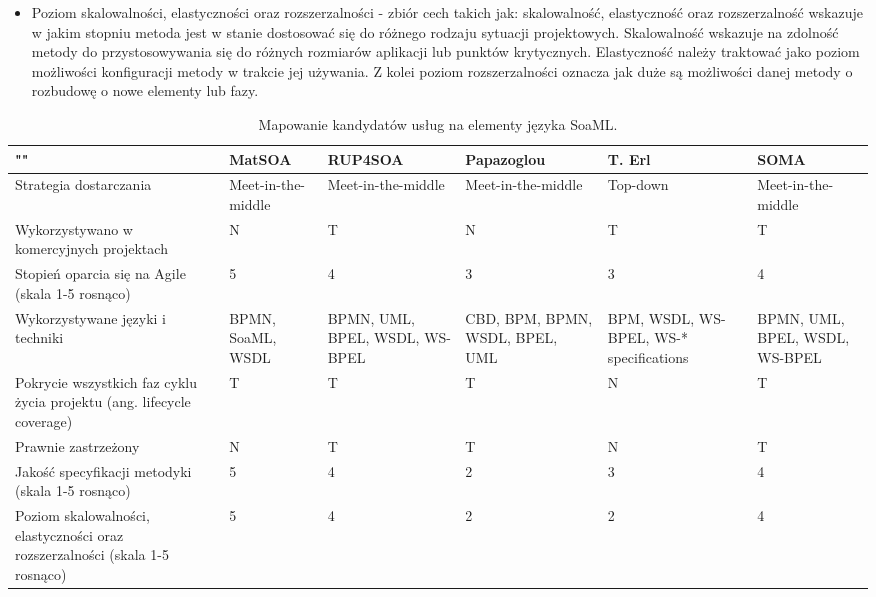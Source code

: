 \begin{itemize}
\item{Poziom skalowalności, elastyczności oraz rozszerzalności - zbiór cech takich jak: skalowalność, elastyczność oraz rozszerzalność wskazuje w jakim stopniu metoda jest w stanie dostosować się do różnego rodzaju sytuacji projektowych. Skalowalność wskazuje na zdolność metody do przystosowywania się do różnych rozmiarów aplikacji lub punktów krytycznych. Elastyczność należy traktować jako poziom możliwości konfiguracji metody w trakcie jej używania. Z kolei poziom rozszerzalności oznacza jak duże są możliwości danej metody o rozbudowę o nowe elementy lub fazy. }
\end{itemize}

\begin{table}[!htbp]
\begin{center}
\begin{small}
\begin{supertabular}{|p{4cm}|p{2cm}|p{2cm}|p{2.2cm}|p{2cm}|p{2cm}|}\hline
\textbf{""} & \textbf{MatSOA} & \textbf{RUP4SOA} & \textbf{Papazoglou} & \textbf{T. Erl} & \textbf{SOMA}\\\hline
Strategia dostarczania & Meet-in-the-middle & Meet-in-the-middle & Meet-in-the-middle & Top-down & Meet-in-the-middle\\\hline
Wykorzystywano w komercyjnych projektach & N & T & N & T & T \\\hline
Stopień oparcia się na Agile (skala 1-5 rosnąco) & 5 & 4 & 3 & 3 & 4 \\\hline
Wykorzystywane języki i techniki & BPMN, SoaML, WSDL& BPMN, UML, BPEL, WSDL, WS-BPEL & CBD, BPM, BPMN, WSDL, BPEL, UML & BPM, WSDL, WS-BPEL, WS-* specifications & BPMN, UML, BPEL, WSDL, WS-BPEL \\\hline
Pokrycie wszystkich faz cyklu życia projektu (ang. lifecycle coverage) & T & T & T & N & T \\\hline
Prawnie zastrzeżony & N & T & T & N & T \\\hline
Jakość specyfikacji metodyki (skala 1-5 rosnąco) & 5 & 4 & 2 & 3 & 4 \\\hline
Poziom skalowalności, elastyczności oraz rozszerzalności (skala 1-5 rosnąco)  & 5 &4 & 2 & 2 & 4 \\\hline

\end{supertabular}
\end{small}
\end{center}
 \caption{Mapowanie kandydatów usług na elementy języka SoaML.}
 \label{tabela_methods_comparison}
\end{table}
 
